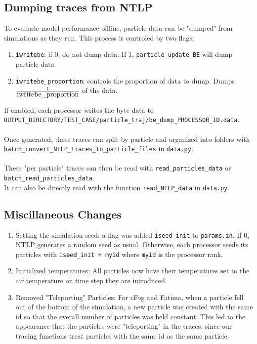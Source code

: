 \documentclass{article}
\begin{document}
\subsection{Dumping traces from NTLP}
To evaluate model performance offline, particle data can be "dumped" from simulations as they run. This process is controled by two flags:
\begin{enumerate}
	\item \lstinline{iwritebe}: if $0$, do not dump data. If $1$, \lstinline{particle_update_BE} will dump particle data.
	\item \lstinline{iwritebe_proportion}: controls the proportion of data to dump. Dumps $\frac{1}{\lstinline{iwritebe{_}proportion}}$ of the data.
\end{enumerate}
If enabled, each processor writes the byte data to\\
\lstinline{OUTPUT_DIRECTORY/TEST_CASE/particle_traj/be_dump_PROCESSOR_ID.data}.\\\\
Once generated, these traces can split by particle and organized into folders with\\
\lstinline{batch_convert_NTLP_traces_to_particle_files} in \lstinline{data.py}.\\\\
These "per particle" traces can then be read with \lstinline{read_particles_data} or \lstinline{batch_read_particles_data}.\\
It can also be directly read with the function \lstinline{read_NTLP_data} in \lstinline{data.py}.
\subsection{Miscillaneous Changes}
\begin{enumerate}
	\item Setting the simulation seed: a flag was added \lstinline{iseed_init} to \lstinline{params.in}. If $0$, NTLP generates a random seed as usual. Otherwise, each processor seeds its particles with \lstinline{iseed_init + myid} where \lstinline{myid} is the processor rank.
	\item Initialized temperatures: All particles now have their temperatures set to the air temperature on time step they are introduced.
	\item Removed "Teleporting" Particles: For cFog and Fatima, when a particle fell out of the bottom of the simulation, a new particle was created with the same id so that the overall number of particles was held constant. This led to the appearance that the particles were "teleporting" in the traces, since our tracing functions treat particles with the same id as the same particle.
\end{enumerate}
\end{document}

